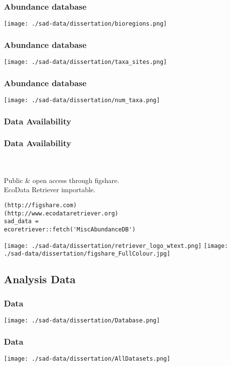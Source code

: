 \documentclass[14pt]{beamer}
\begin{document}
\begin{frame}{}
\frametitle{Abundance database}
\texttt{[image: ./sad-data/dissertation/bioregions.png]}
\end{frame}

\begin{frame}{}
\frametitle{Abundance database}
\texttt{[image: ./sad-data/dissertation/taxa\_sites.png]}
\end{frame}

\begin{frame}{}
\frametitle{Abundance database}
\texttt{[image: ./sad-data/dissertation/num\_taxa.png]}
\end{frame}

\subsubsection{Data Availability}
\begin{frame}[fragile]
\frametitle{Data Availability}
~\\
~\\
Public \& open access through figshare.\\
EcoData Retriever importable.\\
\begin{verbatim}
(http://figshare.com)
(http://www.ecodataretriever.org)
sad_data = 
ecoretriever::fetch('MiscAbundanceDB')
\end{verbatim}
\texttt{[image: ./sad-data/dissertation/retriever\_logo\_wtext.png]}
\texttt{[image: ./sad-data/dissertation/figshare\_FullColour.jpg]}
\end{frame}

\subsection{Analysis Data}
\begin{frame}{}
\frametitle{Data}
\begin{center}
\texttt{[image: ./sad-data/dissertation/Database.png]}
\end{center}
\end{frame}


\begin{frame}{}
\frametitle{Data}
\texttt{[image: ./sad-data/dissertation/AllDatasets.png]}
\end{frame}
\end{document}
